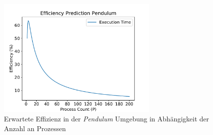\begin{figure}[!h]
	\centering
	\includegraphics[width=0.7\textwidth]{./img/pendulum_analysis/pendulum_efficiency_prediction.pdf} 
	\caption{Erwartete Effizienz in der \emph{Pendulum} Umgebung in Abhängigkeit der Anzahl an Prozessen}
	\label{fig:mountain_car_efficiency_predidction}
\end{figure}


